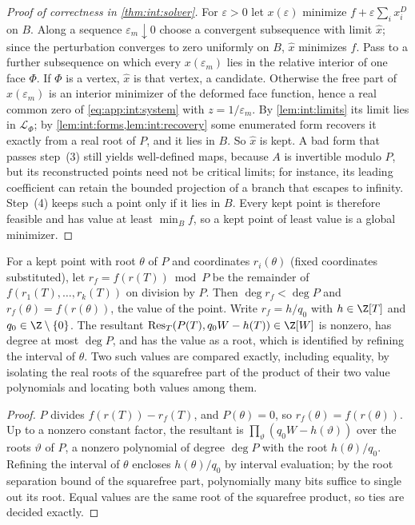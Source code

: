\begin{proof}[Proof of correctness in \cref{thm:int:solver}]
For $\varepsilon>0$ let $x(\varepsilon)$ minimize $f+\varepsilon\sum_ix_i^D$ on
$B$. Along a sequence $\varepsilon_m\downarrow0$ choose a convergent subsequence
with limit $\hat x$; since the perturbation converges to zero uniformly on $B$,
$\hat x$ minimizes $f$. Pass to a further subsequence on which every
$x(\varepsilon_m)$ lies in the relative interior of one face $\Phi$. If $\Phi$ is
a vertex, $\hat x$ is that vertex, a candidate. Otherwise the free part of
$x(\varepsilon_m)$ is an interior minimizer of the deformed face function, hence
a real common zero of \eqref{eq:app:int:system} with $z=1/\varepsilon_m$. By
\cref{lem:int:limits} its limit lies in $\mathcal L_\Phi$; by
\cref{lem:int:forms,lem:int:recovery} some enumerated form recovers it exactly
from a real root of $P$, and it lies in $B$. So $\hat x$ is kept. A bad form
that passes step~(3) still yields well-defined maps, because $A$ is invertible
modulo $P$, but its reconstructed points need not be critical limits; for
instance, its leading coefficient can retain the bounded projection of a
branch that escapes to infinity. Step~(4) keeps such a point only if it lies
in $B$. Every kept point is therefore feasible and has value at least
$\min_Bf$, so a kept point of least value is a global minimizer.
\end{proof}

\begin{lemma}\label{lem:int:values}
For a kept point with root $\theta$ of $P$ and coordinates $r_i(\theta)$ (fixed
coordinates substituted), let $r_f=f(r(T))\bmod P$ be the remainder of
$f(r_1(T),\ldots,r_k(T))$ on division by $P$. Then $\deg r_f<\deg P$ and
$r_f(\theta)=f(r(\theta))$, the value of the point. Write $r_f=h/q_0$ with
$h\in\Z[T]$ and $q_0\in\Z\setminus\{0\}$. The resultant
$\operatorname{Res}_T(P(T),q_0W-h(T))\in\Z[W]$ is nonzero, has degree at most
$\deg P$, and has the value as a root, which is identified by refining the
interval of $\theta$. Two such values are compared exactly, including
equality, by isolating the real roots of the squarefree part of the product
of their two value polynomials and locating both values among them.
\end{lemma}

\begin{proof}
$P$ divides $f(r(T))-r_f(T)$, and $P(\theta)=0$, so $r_f(\theta)=f(r(\theta))$.
Up to a nonzero constant factor, the resultant is
$\prod_\vartheta(q_0W-h(\vartheta))$ over the roots $\vartheta$ of $P$, a
nonzero polynomial of degree $\deg P$ with the root $h(\theta)/q_0$. Refining
the interval of $\theta$ encloses $h(\theta)/q_0$ by interval evaluation; by the
root separation bound of the squarefree part, polynomially many bits suffice
to single out its root. Equal values are the same root of the squarefree
product, so ties are decided exactly.
\end{proof}

